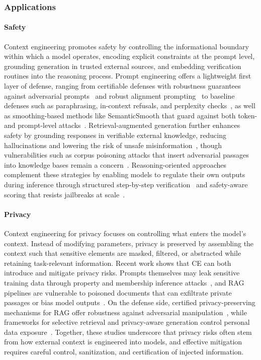 \subsubsection{Applications}

\paragraph{Safety}

Context engineering promotes safety by controlling the informational boundary within which a model operates, encoding explicit constraints at the prompt level, grounding generation in trusted external sources, and embedding verification routines into the reasoning process. Prompt engineering offers a lightweight first layer of defense, ranging from certifiable defenses with robustness guarantees against adversarial prompts~\citep{kumar2024certifying} and robust alignment prompting~\citep{cao2024defending} to baseline defenses such as paraphrasing, in-context refusals, and perplexity checks~\citep{zhou2024defending}, as well as smoothing-based methods like SemanticSmooth that guard against both token- and prompt-level attacks~\citep{ji2024defending}. Retrieval-augmented generation further enhances safety by grounding responses in verifiable external knowledge, reducing hallucinations and lowering the risk of unsafe misinformation~\citep{wei2023jailbreak, hong2024so}, though vulnerabilities such as corpus poisoning attacks that insert adversarial passages into knowledge bases remain a concern~\citep{zhong2023poisoning}. Reasoning-oriented approaches complement these strategies by enabling models to regulate their own outputs during inference through structured step-by-step verification~\citep{li2025safetyanalyst} and safety-aware scoring that resists jailbreaks at scale~\citep{qiu2025saffron}.

\paragraph{Privacy}

Context engineering for privacy focuses on controlling what enters the model's context. Instead of modifying parameters, privacy is preserved by assembling the context such that sensitive elements are masked, filtered, or abstracted while retaining task-relevant information. Recent work shows that CE can both introduce and mitigate privacy risks. Prompts themselves may leak sensitive training data through property and membership inference attacks~\citep{wu2024quantifying}, and RAG pipelines are vulnerable to poisoned documents that can exfiltrate private passages or bias model outputs~\citep{chaudhari2024phantom}. On the defense side, certified privacy-preserving mechanisms for RAG offer robustness against adversarial manipulation~\citep{zou2025poisonedrag}, while frameworks for selective retrieval and privacy-aware generation control personal data exposure~\citep{tong2025inferdpt}. Together, these studies underscore that privacy risks often stem from how external context is engineered into models, and effective mitigation requires careful control, sanitization, and certification of injected information.

